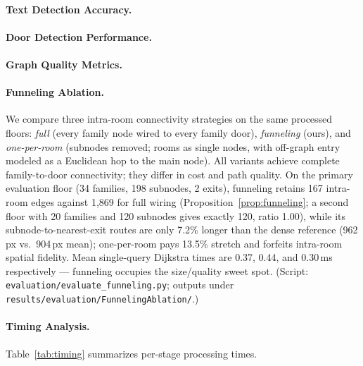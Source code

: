 \documentclass[manuscript,screen,review]{acmart}
\begin{document}
\paragraph{Text Detection Accuracy.}

\paragraph{Door Detection Performance.}

\paragraph{Graph Quality Metrics.}

\paragraph{Funneling Ablation.}
We compare three intra-room connectivity strategies on the same processed floors: \emph{full} (every family node wired to every family door), \emph{funneling} (ours), and \emph{one-per-room} (subnodes removed; rooms as single nodes, with off-graph entry modeled as a Euclidean hop to the main node). All variants achieve complete family-to-door connectivity; they differ in cost and path quality. On the primary evaluation floor (34 families, 198 subnodes, 2 exits), funneling retains 167 intra-room edges against 1{,}869 for full wiring (Proposition~\ref{prop:funneling}; a second floor with 20 families and 120 subnodes gives exactly 120, ratio 1.00), while its subnode-to-nearest-exit routes are only 7.2\% longer than the dense reference (962\,px vs.\ 904\,px mean); one-per-room pays 13.5\% stretch and forfeits intra-room spatial fidelity. Mean single-query Dijkstra times are 0.37, 0.44, and 0.30\,ms respectively --- funneling occupies the size/quality sweet spot. (Script: \texttt{evaluation/evaluate\_funneling.py}; outputs under \texttt{results/evaluation/FunnelingAblation/}.)

\paragraph{Timing Analysis.}
Table~\ref{tab:timing} summarizes per-stage processing times.
\end{document}
